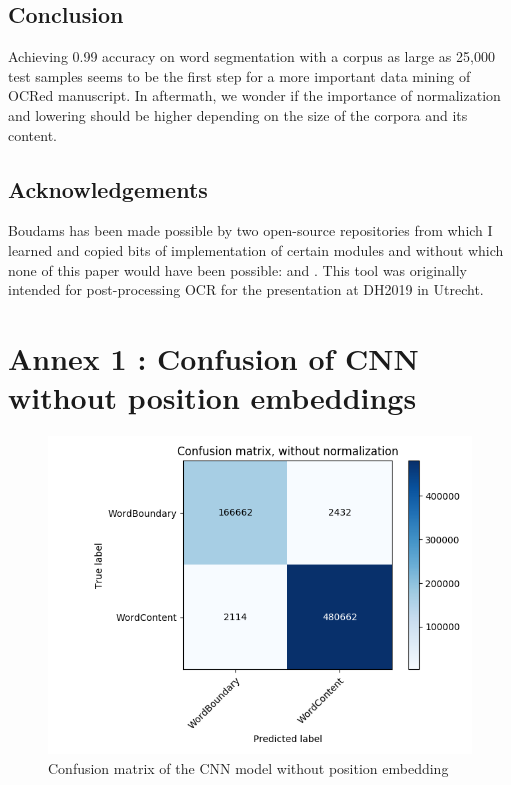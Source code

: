\documentclass{jdmdh}
\begin{document}
\subsection{Conclusion}

Achieving 0.99 accuracy on word segmentation with a corpus as large as 25,000 test samples seems to be the first step for a more important data mining of OCRed manuscript. In aftermath, we wonder if the importance of normalization and lowering should be higher depending on the size of the corpora and its content. 

\subsection{Acknowledgements}

Boudams has been made possible by two open-source repositories from which I learned and copied bits of implementation of certain modules and without which none of this paper would have been possible: \citet{enrique_manjavacas_2019_2654987} and \citet{bentrevett}. This tool was originally intended for post-processing OCR for the presentation \citet{pinchecampsclerice} at DH2019 in Utrecht.






\appendix\footnotesize

\section{Annex 1 : Confusion of CNN without position embeddings}

\begin{figure}[!ht]
  \centering
  \includegraphics[width=\linewidth]{confusion.png}
  \caption{Confusion matrix of the CNN model without position embedding}
  \label{fig:confusion_matrix}
\end{figure}
\end{document}
